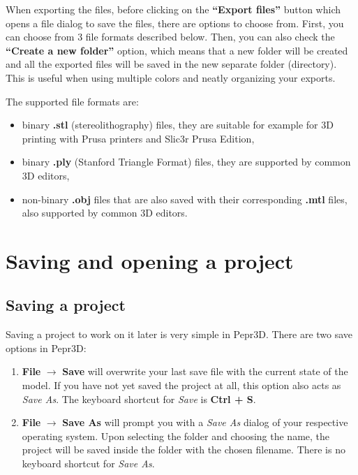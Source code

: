 When exporting the files, before clicking on the \textbf{``Export files''} button which opens a file dialog to save the files, there are options to choose from.
First, you can choose from 3 file formats described below.
Then, you can also check the \textbf{``Create a new folder''} option, which means that a new folder will be created and all the exported files will be saved in the new separate folder (directory).
This is useful when using multiple colors and neatly organizing your exports.

The supported file formats are:

\begin{itemize}
\item binary \textbf{.stl} (stereolithography) files, they are suitable for example for 3D printing with Prusa printers and Slic3r Prusa Edition,
\item binary \textbf{.ply} (Stanford Triangle Format) files, they are supported by common 3D editors,
\item non-binary \textbf{.obj} files that are also saved with their corresponding \textbf{.mtl} files, also supported by common 3D editors.
\end{itemize}

\section{Saving and opening a project}

\subsection{Saving a project}

Saving a project to work on it later is very simple in Pepr3D. There are two save options in Pepr3D:

\begin{enumerate}
\item \textbf{File} $\rightarrow$ \textbf{Save} will overwrite your last save file with the current state of the model. If you have not yet saved the project at all, this option also acts as \textit{Save As}. The keyboard shortcut for \textit{Save} is \textbf{Ctrl + S}.

\item \textbf{File} $\rightarrow$ \textbf{Save As} will prompt you with a \textit{Save As} dialog of your respective operating system. Upon selecting the folder and choosing the name, the project will be saved inside the folder with the chosen filename. There is no keyboard shortcut for \textit{Save As}.
\end{enumerate}

